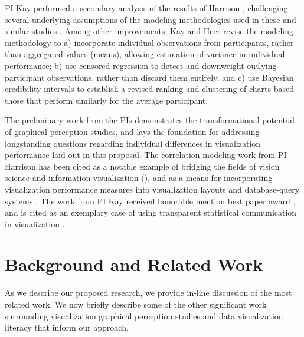 \documentclass[11pt]{article}
\begin{document}
PI Kay performed a secondary analysis of the results of Harrison \etal, challenging several underlying assumptions of the modeling methodologies used in these and similar studies \cite{kay2016beyond}.
Among other improvements, Kay and Heer revise the modeling methodology to a) incorporate individual observations from participants, rather than aggregated values (\eg means), allowing estimation of variance in individual performance; b) use censored regression to detect and downweight outlying participant observations, rather than discard them entirely, and c) use Bayesian credibility intervals to establish a revised ranking and clustering of charts based those that perform similarly for the average participant.

The preliminary work from the PIs demonstrates the transformational potential of graphical perception studies, and lays the foundation for addressing longstanding questions regarding individual differences in visualization performance laid out in this proposal.
The correlation modeling work from PI Harrison has been cited as a notable example of bridging the fields of vision science and information visualization (\eg \cite{rensink2014prospects, nothelfer2016vision}), and as a means for incorporating visualization performance measures into visualization layouts \cite{raidou2016orientation} and database-query systems \cite{alabi2016pfunk}.
The work from PI Kay received honorable mention best paper award \cite{kay2016beyond}, and is cited as an exemplary case of using transparent statistical communication in visualization \cite{kosara2016empire}.

\section{Background and Related Work} %

As we describe our proposed research, we provide in-line discussion of the most related work.
We now briefly describe some of the other significant work surrounding visualization graphical perception studies and data visualization literacy that inform our approach.
\end{document}

